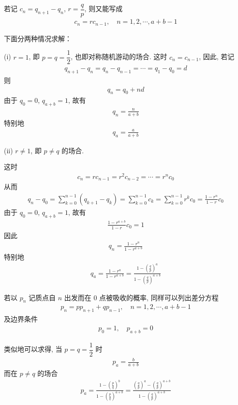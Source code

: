 \documentclass[../../main.tex]{subfiles}
\begin{document}
若记 $c_n=q_{n+1}-q_n$, $r=\dfrac{q}{p}$, 则又能写成
\begin{align*}
c_n=rc_{n-1},\quad n=1,2,\cdots,a+b-1
\end{align*}

下面分两种情况求解：

(i) $r=1$, 即 $p=q=\dfrac{1}{2}$, 也即对称随机游动的场合. 这时 $c_n=c_{n-1}$, 因此, 若记
\begin{align*}
q_{n+1}-q_n=q_n-q_{n-1}=\cdots=q_1-q_0=d
\end{align*}
则
\begin{align*}
q_n=q_0+nd
\end{align*}
由于 $q_0=0$, $q_{a+b}=1$, 故有
\begin{align*}
q_n=\frac{n}{a+b}
\end{align*}
特别地
\begin{align}\label{align:ch02-对称吸收壁结果}
q_a=\frac{a}{a+b}
\end{align}

(ii) $r\neq 1$, 即 $p\neq q$ 的场合.

这时
\begin{align*}
c_n=rc_{n-1}=r^2c_{n-2}=\cdots=r^n c_0
\end{align*}
从而
\begin{align*}
q_n-q_0=\sum_{k=0}^{n-1}(q_{k+1}-q_k)=\sum_{k=0}^{n-1} c_k=\sum_{k=0}^{n-1} r^k c_0=\frac{1-r^n}{1-r}c_0
\end{align*}
由于 $q_0=0$, $q_{a+b}=1$, 故有
\begin{align*}
\frac{1-r^{a+b}}{1-r}c_0=1
\end{align*}
因此
\begin{align*}
q_n=\frac{1-r^n}{1-r^{a+b}}
\end{align*}
特别地
\begin{align}\label{align:ch02-非对称吸收壁结果}
q_a=\frac{1-r^a}{1-r^{a+b}}=\frac{1-\left(\frac{q}{p}\right)^a}{1-\left(\frac{q}{p}\right)^{a+b}}
\end{align}

若以 $p_n$ 记质点自 $n$ 出发而在 $0$ 点被吸收的概率, 同样可以列出差分方程
\begin{align*}
p_n=pp_{n+1}+qp_{n-1},\quad n=1,2,\cdots,a+b-1
\end{align*}
及边界条件
\begin{align*}
p_0=1,\quad p_{a+b}=0
\end{align*}

类似地可以求得, 当 $p=q=\dfrac{1}{2}$ 时
\begin{align}\label{align:ch02-对称吸收壁p结果}
p_a=\frac{b}{a+b}
\end{align}
而在 $p\neq q$ 的场合
\begin{align}\label{align:ch02-非对称吸收壁p结果}
p_a=\frac{1-\left(\frac{p}{q}\right)^b}{1-\left(\frac{p}{q}\right)^{a+b}}=\frac{\left(\frac{q}{p}\right)^a-\left(\frac{q}{p}\right)^{a+b}}{1-\left(\frac{q}{p}\right)^{a+b}}
\end{align}
\end{document}
